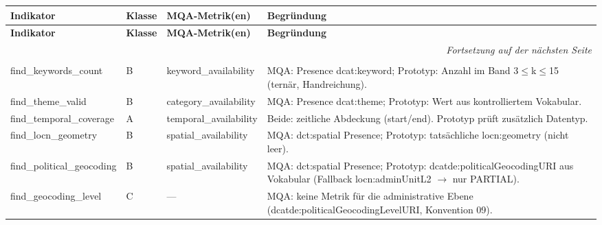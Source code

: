 \begingroup
\tiny
\renewcommand{\arraystretch}{1.15}

\setlength{\LTleft}{\fill}
\setlength{\LTright}{\fill}

\begin{longtable}{p{3.1cm} p{0.7cm} p{3.6cm} p{6.8cm}}
\label{tab:mqa_abc_mapping}\\

\toprule
\textbf{Indikator} & \textbf{Klasse} & \textbf{MQA-Metrik(en)} & \textbf{Begründung} \\
\midrule
\endfirsthead

\toprule
\textbf{Indikator} & \textbf{Klasse} & \textbf{MQA-Metrik(en)} & \textbf{Begründung} \\
\midrule
\endhead

\midrule
\multicolumn{4}{r}{\textit{Fortsetzung auf der nächsten Seite}} \\
\midrule
\endfoot

\bottomrule
\endlastfoot

\multicolumn{4}{l}{\textbf{Auffindbarkeit}} \\
\midrule

find\_keywords\_count & B & keyword\_availability & MQA: Presence dcat:keyword; Prototyp: Anzahl im Band 3$\leq$k$\leq$15 (ternär, Handreichung). \\

find\_theme\_valid & B & category\_availability & MQA: Presence dcat:theme; Prototyp: Wert aus kontrolliertem Vokabular. \\

find\_temporal\_coverage & A & temporal\_availability & Beide: zeitliche Abdeckung (start/end). Prototyp prüft zusätzlich Datentyp. \\

find\_locn\_geometry & B & spatial\_availability & MQA: dct:spatial Presence; Prototyp: tatsächliche locn:geometry (nicht leer). \\

find\_political\_geocoding & B & spatial\_availability & MQA: dct:spatial Presence; Prototyp: dcatde:politicalGeocodingURI aus Vokabular (Fallback locn:adminUnitL2 $\rightarrow$ nur PARTIAL). \\

find\_geocoding\_level & C & --- & MQA: keine Metrik für die administrative Ebene (dcatde:politicalGeocodingLevelURI, Konvention 09). \\


\end{longtable}
